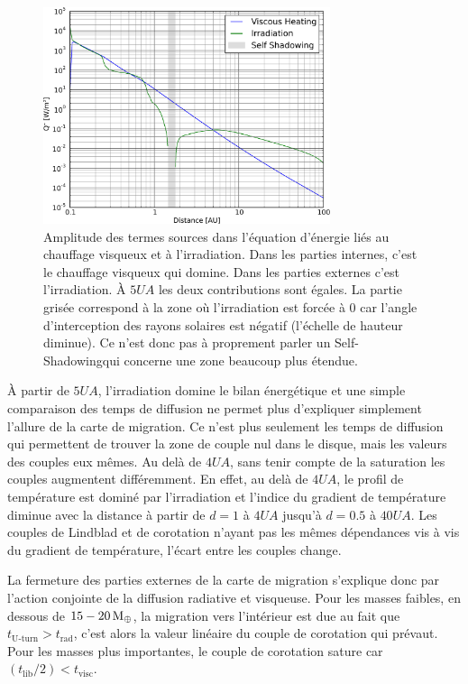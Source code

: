 \begin{figure}[htbp]
\centering
\includegraphics[width=0.75\textwidth]{figure/migration_map/viscous_vs_irradiation.pdf}

\caption{Amplitude des termes sources dans l'équation d'énergie liés au chauffage visqueux et à l'irradiation. Dans les parties internes, c'est le
chauffage visqueux qui domine. Dans les parties externes c'est l'irradiation. À $5\unit{UA}$ les deux contributions sont
égales. La partie grisée correspond à la zone où l'irradiation est forcée à 0 car l'angle d'interception des rayons solaires est négatif (l'échelle de hauteur diminue). Ce n'est donc pas à proprement parler un \og Self-Shadowing\fg qui concerne une zone beaucoup plus étendue.}\label{fig:viscous_vs_irradiation}
\end{figure}

À partir de $5\unit{UA}$, l'irradiation domine le bilan énergétique  et une simple comparaison des temps de diffusion ne permet plus d'expliquer simplement l'allure de la carte de migration. Ce n'est plus seulement les temps de diffusion qui permettent de trouver la zone de couple nul dans le disque, mais les valeurs des couples eux mêmes. Au delà de $4\unit{UA}$, sans tenir compte de la saturation les couples augmentent différemment. En effet, au delà de $4\unit{UA}$, le profil de température est dominé par l'irradiation et l'indice du gradient de température diminue avec la distance à partir de $d=1$ à $4\unit{UA}$ jusqu'à $d=0.5$ à $40\unit{UA}$. Les couples de Lindblad et de corotation n'ayant pas les mêmes dépendances vis à vis du gradient de température, l'écart entre les couples change.

La fermeture des parties externes de la carte de migration s'explique donc par l'action conjointe de la diffusion radiative et visqueuse. Pour les masses
faibles, en dessous de $15-20\mathrm{\thinspace M_\oplus}$, la migration vers l'intérieur est due au fait que $t_\text{U-turn} > t_\text{rad}$, c'est
alors la valeur linéaire du couple de corotation qui prévaut. Pour les masses plus importantes, le couple de corotation sature
car $(t_\text{lib}/2) < t_\text{visc}$. 

